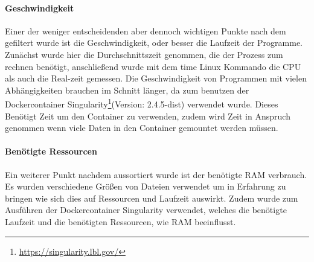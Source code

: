 \documentclass{scrartcl}
\begin{document}
\paragraph{Geschwindigkeit}
\label{sec-3-1-2-3}
Einer der weniger entscheidenden aber dennoch wichtigen Punkte nach dem gefiltert wurde ist die Geschwindigkeit, 
oder besser die Laufzeit der Programme. Zunächst wurde hier die Durchschnittszeit genommen, die der Prozess zum rechnen benötigt,
anschließend wurde mit dem time Linux Kommando die CPU als auch die Real-zeit gemessen. Die Geschwindigkeit von Programmen mit vielen Abhängigkeiten 
brauchen im Schnitt länger, da zum benutzen der Dockercontainer Singularity\footnote{\url{https://singularity.lbl.gov/}}(Version: 2.4.5-dist) verwendet wurde. Dieses Benötigt Zeit um den Container zu verwenden,
zudem wird Zeit in Anspruch genommen wenn viele Daten in den Container gemountet werden müssen.
\paragraph{Benötigte Ressourcen}
\label{sec-3-1-2-4}
Ein weiterer Punkt nachdem aussortiert wurde ist der benötigte RAM verbrauch. Es wurden verschiedene Größen von Dateien verwendet
um in Erfahrung zu bringen wie sich dies auf Ressourcen und Laufzeit auswirkt. Zudem wurde zum Ausführen der Dockercontainer 
Singularity \footnotemark[53]{} verwendet, welches die benötigte Laufzeit und die benötigten Ressourcen, wie RAM beeinflusst. 
\end{document}
